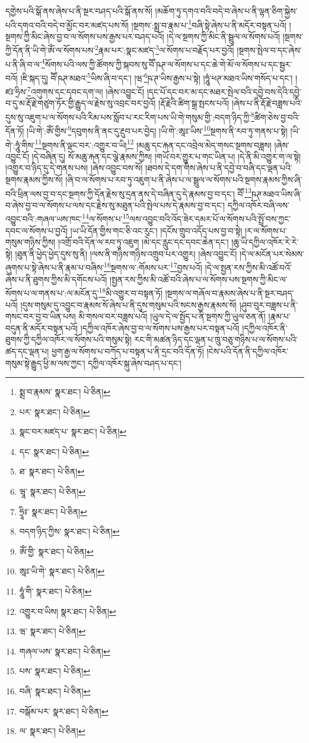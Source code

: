 དགྱེས་པའི་སྒོ་ནས་ཞེས་པ་ནི་སྔར་བཤད་པའི་སྒོ་ནས་སོ། །མཆོག་ཏུ་དགའ་བའི་བདེ་བ་ཞེས་པ་ནི་ལྷན་ཅིག་སྐྱེས་པའི་དགའ་བའི་བདེ་བ་མྱོང་བར་མཛད་པས་སོ། །སྔགས་:སྨྲ་བ་རྣམ་པ་\footnote{སྨྲ་བ་རྣམས་  སྣར་ཐང་།  པེ་ཅིན། }བཞི་སྟེ་ཞེས་པ་ནི་མདོར་བསྟན་པའོ། །སྔགས་ཀྱི་མིང་ཞེས་བྱ་བ་ལ་སོགས་པས་རྒྱས་པར་བཤད་པའོ། །དེ་ལ་སྔགས་ཀྱི་མིང་ནི་སྦྲུལ་ལ་སོགས་པའོ། །སྔགས་ཀྱི་དོན་ནི་ཡི་གེ་ཨོཾ་ལ་སོགས་པས་\footnote{པར་  སྣར་ཐང་།  པེ་ཅིན། }རྣམ་པར་:སྣང་མཛད་\footnote{སྣང་བར་མཛད་པ་  སྣར་ཐང་།  པེ་ཅིན། }ལ་སོགས་པ་བརྗོད་པར་བྱའོ། །སྔགས་སྤེལ་བ་དང་ཞེས་པ་ནི་ཞི་བ་ལ་\footnote{དང་  སྣར་ཐང་།  པེ་ཅིན། }སོགས་པའི་ལས་ཀྱི་ཚོགས་ཀྱི་སྐབས་སུ་བཽ་ཥཊ་ལ་སོགས་པ་དང་ཆེ་གེ་མོ་ལ་སོགས་པ་དང་སྦྱར་བའོ། །ཇི་སྐད་དུ། བཽ་ཥཊ་མཐའ་\footnote{ཐ་  སྣར་ཐང་།  པེ་ཅིན། }ཡིས་ཞི་བ་དང་། །ཝ་\footnote{ཝཱ་  སྣར་ཐང་།  པེ་ཅིན། }ཥ་ཊ་ཡིས་རྒྱས་པ་སྟེ། །ཧཱུཾ་ཕཊ་མཐའ་ཡིས་གསོད་པ་དང་། །ཛཿ་ཧྲིས་\footnote{ཧྲཱིཿ་  སྣར་ཐང་།  པེ་ཅིན། }འགུགས་དང་དབང་དག་ལ། །ཞེས་འབྱུང་ངོ། །དང་པོ་དང་བར་མ་དང་མཐར་སྤེལ་བའི་དབྱེ་བས་དེའི་དབྱེ་བ་དུ་མ་རྡོ་རྗེ་གཙུག་ཏོར་གྱི་རྒྱུད་ལ་རྗེས་སུ་འབྲང་བར་བྱའོ། །རྡོ་རྗེའི་ཚིག་སྒྲ་སྤངས་པའོ། །ཞེས་པ་ནི་རྡོ་རྗེ་བཟླས་པའི་དུས་སུ་འཇུག་པ་ལ་སོགས་པའི་རིམ་པས་སློབ་པ་རང་རིག་པས་ཡི་གེ་གསུམ་གྱི་:བདག་ཉིད་ཀྱི་\footnote{བདག་ཉིད་ཀྱིས་  སྣར་ཐང་།  པེ་ཅིན། }ཚིག་ཅེས་བྱ་བའི་དོན་ཏོ། །ཡི་གེ་:ཨོཾ་གྱིས་\footnote{ཨོཾ་གྱི་  སྣར་ཐང་།  པེ་ཅིན། }དབུགས་ནི་ནང་དུ་རྔུབ་པར་བྱེད། །ཡི་གེ་:ཨཱཿ་ཡིས་\footnote{ཨཱཿ་ཡི་གེ་  སྣར་ཐང་།  པེ་ཅིན། }སྔགས་ནི་རབ་ཏུ་གནས་པ་སྟེ། །ཡི་གེ་:ཧཱུཾ་གིས་\footnote{ཧཱུཾ་གི་  སྣར་ཐང་།  པེ་ཅིན། }སྔགས་ནི་ལྡང་བར་:འགྱུར་བ་ཡི།\footnote{འགྱུར་བ་ཡིས།  སྣར་ཐང་།  པེ་ཅིན། } །མཆུ་དང་རྐན་དང་འབྲེལ་མེད་གསང་སྔགས་བཟླས། །ཞེས་འབྱུང་ངོ། །དེ་བཞིན་དུ། སོ་མཆུ་རྐན་དང་ལྕེ་རྣམས་ཀྱིས། །གཡོ་བར་གྱུར་པ་གང་ཡིན་པ། །དེ་ནི་མི་འགྱུར་ག་ལ་སྟེ། །འགྱུར་བ་ཉིད་དུ་དེ་གནས་པས། །ཞེས་འབྱུང་བས་སོ། །ཐབས་དེ་དག་གིས་ཞེས་པ་ནི་དབྱེ་བ་བཞི་དང་ལྡན་པའི་སྔགས་རྣམས་ཀྱིས་སོ། །ཞི་བ་ལ་སོགས་པ་རབ་ཏུ་འཇུག་པ་ནི་ཞེས་པ་ལ་སྦྲུལ་ལ་སོགས་པའི་སྔགས་རྣམས་ཀྱིས་ཞི་བའི་ཕྲིན་ལས་བྱ་བ་དང་སྔགས་ཀྱི་དོན་རྗེས་སུ་དྲན་ནས་དེ་བཞིན་དུ་དེ་རྣམས་བྱ་བ་དང་། བཽ་\footnote{ཝ་  སྣར་ཐང་།  པེ་ཅིན། }ཥཊ་མཐའ་ཡིས་ཞི་བ་ཞེས་བྱ་བ་ལ་སོགས་པ་ལས་དང་རྗེས་སུ་མཐུན་པའི་སྤེལ་པས་དེ་རྣམས་བྱ་བ་དང་། དཀྱིལ་འཁོར་བཞི་ལས་འབྱུང་བའི་:གཞལ་ཡས་ཁང་\footnote{གཞལ་ཡས་  སྣར་ཐང་།  པེ་ཅིན། }ལ་སོགས་པ་\footnote{པས་  སྣར་ཐང་།  པེ་ཅིན། }ལས་འབྱུང་བའི་འོད་ཟེར་དམར་པོ་ལ་སོགས་པའི་སྤྲོ་བས་ཀྱང་དབང་ལ་སོགས་པ་བྱའོ། །ཡ་ཡི་དོན་གྱིས་གང་ཅི་འང་རུང་། །དངོས་གྲུབ་འདོད་པས་བྱ་བ་སྟེ། །ར་ལ་སོགས་པ་གསུམ་གཉིས་ཀྱིས། །འགྲོ་བའི་དོན་ལ་རབ་ཏུ་འཇུག །མེ་དང་རླུང་དང་དབང་ཆེན་དང་། །ཆུ་ཡི་དཀྱིལ་འཁོར་རེ་རེ་སྟེ། །ཐུན་ནི་ཕྱེད་ཕྱེད་དུས་སུ་ནི། །ལས་ནི་གཉིས་གཉིས་འགྲུབ་པར་འགྱུར། །ཞེས་འབྱུང་ངོ། །དེ་ལ་མངོན་པར་སེམས་ཞུགས་པ་སྟེ་ཞེས་པ་ནི་རྣམ་པ་བཞིས་\footnote{བཞི་  སྣར་ཐང་།  པེ་ཅིན། }སྔགས་ལ་:གོམས་པར་\footnote{བསྒོམ་པར་  སྣར་ཐང་།  པེ་ཅིན། }བྱས་པའོ། །དེ་ལ་སྤྱན་རས་ཀྱིས་མི་འཚོ་བའོ་ཞེས་པ་ནི་ཐུགས་ཀྱིས་མི་དགོངས་པའོ། །སྤྱན་རས་ཀྱིས་མི་འཚོ་བའི་ཞེས་པ་ལ་སོགས་པས་སྔགས་ཀྱི་མིང་ལ་སོགས་པ་ལ་གནས་པ་:ལ་མངོན་དུ་\footnote{ལ་  སྣར་ཐང་།  པེ་ཅིན། }མི་འགྱུར་བ་བསྟན་ཏོ། །སྔགས་ལ་གཞོལ་བ་རྣམས་ཞེས་པ་ནི་སྔར་བཤད་པའོ། །དུས་གསུམ་དུ་འབྱུང་བ་རྣམས་སོ་ཞེས་པ་ནི་དུས་གསུམ་པའི་སངས་རྒྱས་རྣམས་སོ། །ཤུབ་བུར་བཟླས་པ་ནི་གསང་བར་བྱ་བ་ཡིན་པས། མི་གསལ་བར་བཟླས་པའོ། །ཡུལ་དེ་ལ་སྤྱོད་པ་ནི་སྔགས་ཀྱི་ཡུལ་ཅན་ནོ། །རྣམ་པ་བདུན་ནི་མདོར་བསྟན་པའོ། །དཀྱིལ་འཁོར་ཞེས་བྱ་བ་ལ་སོགས་པས་རྒྱས་པར་བསྟན་པའོ། །དཀྱིལ་འཁོར་ནི་ཐུགས་ཀྱི་དཀྱིལ་འཁོར་ལ་སོགས་པའི་གསུམ་སྟེ། རང་གི་མཚན་ཉིད་དང་ལྡན་པ་ཁྲུ་བཅུ་གཉིས་པ་ལ་སོགས་པའི་ཚད་དང་ལྡན་པ། ཕྱག་རྒྱ་ལ་སོགས་པ་བཀོད་པ་བསྟན་པ་ནི་དྲང་བའི་དོན་ཏོ། །ངེས་པའི་དོན་ནི་དཀྱིལ་འཁོར་གསུམ་སྟེ་རྒྱུད་ཕྱི་མ་ལས་ཀྱང་། དཀྱིལ་འཁོར་སྐུ་ཞེས་བཤད་པ་དང་། 